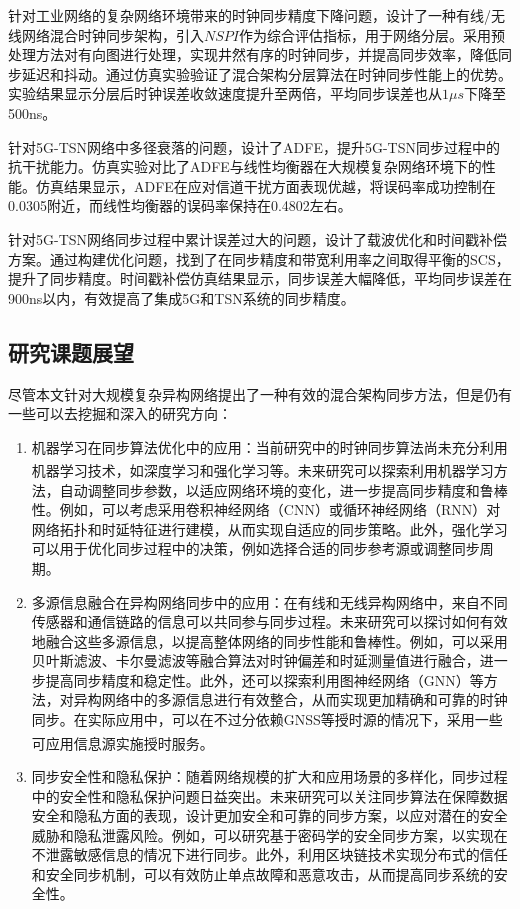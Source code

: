 \documentclass[UTF8,a4paper,12pt]{ctexart}
\numberwithin{equation}{section}
\begin{document}
针对工业网络的复杂网络环境带来的时钟同步精度下降问题，设计了一种有线/无线网络混合时钟同步架构，引入$NSPI$作为综合评估指标，用于网络分层。采用预处理方法对有向图进行处理，实现井然有序的时钟同步，并提高同步效率，降低同步延迟和抖动。通过仿真实验验证了混合架构分层算法在时钟同步性能上的优势。实验结果显示分层后时钟误差收敛速度提升至两倍，平均同步误差也从$1\mu s$下降至500ns。

针对5G-TSN网络中多径衰落的问题，设计了ADFE，提升5G-TSN同步过程中的抗干扰能力。仿真实验对比了ADFE与线性均衡器在大规模复杂网络环境下的性能。仿真结果显示，ADFE在应对信道干扰方面表现优越，将误码率成功控制在0.0305附近，而线性均衡器的误码率保持在0.4802左右。

针对5G-TSN网络同步过程中累计误差过大的问题，设计了载波优化和时间戳补偿方案。通过构建优化问题，找到了在同步精度和带宽利用率之间取得平衡的SCS，提升了同步精度。时间戳补偿仿真结果显示，同步误差大幅降低，平均同步误差在900ns以内，有效提高了集成5G和TSN系统的同步精度。

\subsection{研究课题展望}
 尽管本文针对大规模复杂异构网络提出了一种有效的混合架构同步方法，但是仍有一些可以去挖掘和深入的研究方向：
 
 \begin{enumerate}
 	\item 机器学习在同步算法优化中的应用：当前研究中的时钟同步算法尚未充分利用机器学习技术，如深度学习和强化学习等\textsuperscript{\cite{jiqi}}。未来研究可以探索利用机器学习方法，自动调整同步参数，以适应网络环境的变化，进一步提高同步精度和鲁棒性。例如，可以考虑采用卷积神经网络（CNN）或循环神经网络（RNN）对网络拓扑和时延特征进行建模，从而实现自适应的同步策略。此外，强化学习可以用于优化同步过程中的决策，例如选择合适的同步参考源或调整同步周期。
 	\item 多源信息融合在异构网络同步中的应用：在有线和无线异构网络中，来自不同传感器和通信链路的信息可以共同参与同步过程。未来研究可以探讨如何有效地融合这些多源信息，以提高整体网络的同步性能和鲁棒性。例如，可以采用贝叶斯滤波、卡尔曼滤波等融合算法对时钟偏差和时延测量值进行融合，进一步提高同步精度和稳定性。此外，还可以探索利用图神经网络（GNN）等方法，对异构网络中的多源信息进行有效整合，从而实现更加精确和可靠的时钟同步。在实际应用中，可以在不过分依赖GNSS等授时源的情况下，采用一些可应用信息源实施授时服务\textsuperscript{\cite{yang}}。
 	
 	\item 同步安全性和隐私保护：随着网络规模的扩大和应用场景的多样化，同步过程中的安全性和隐私保护问题日益突出。未来研究可以关注同步算法在保障数据安全和隐私方面的表现，设计更加安全和可靠的同步方案，以应对潜在的安全威胁和隐私泄露风险。例如，可以研究基于密码学的安全同步方案，以实现在不泄露敏感信息的情况下进行同步。此外，利用区块链技术实现分布式的信任和安全同步机制，可以有效防止单点故障和恶意攻击，从而提高同步系统的安全性。
 \end{enumerate}
\newpage
{}


\end{document}
